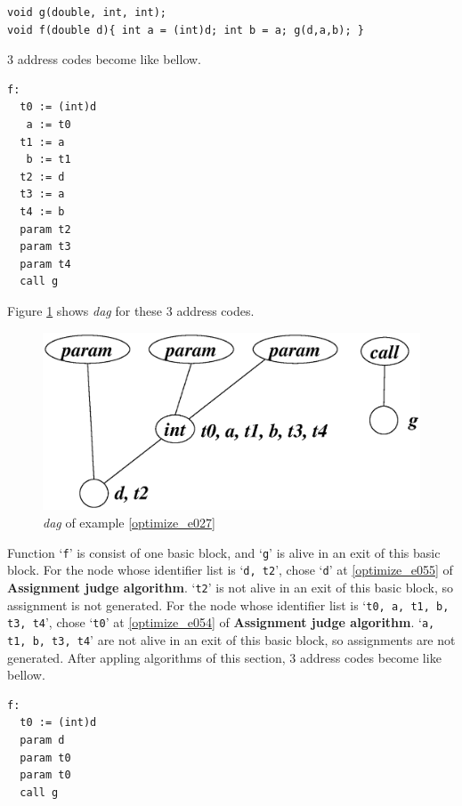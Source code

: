 \begin{Example}
\label{optimize_e027}
\begin{verbatim}
void g(double, int, int);
void f(double d){ int a = (int)d; int b = a; g(d,a,b); }
\end{verbatim}
3 address codes become like bellow.
\begin{verbatim}
f:
  t0 := (int)d
   a := t0
  t1 := a
   b := t1
  t2 := d
  t3 := a
  t4 := b
  param t2
  param t3
  param t4
  call g
\end{verbatim}
Figure \ref{optimize_e028} shows {\em dag} for these 3 address codes.
\begin{figure}[htbp]
\begin{center}
\includegraphics[width=1.0\linewidth,height=0.483\linewidth]{opt012.eps}
\caption{{\em dag} of example \ref{optimize_e027}}
\label{optimize_e028}
\end{center}
\end{figure}
Function `{\tt{f}}' is consist of one basic block, and 
`{\tt{g}}' is alive in an exit of this basic block.
For the node whose identifier list is `{\tt{d, t2}}',
chose `{\tt{d}}' at \ref{optimize_e055} of {\bf Assignment judge
 algorithm}.
`{\tt{t2}}' is not alive in an exit of this basic block, so
assignment is not generated.
For the node whose identifier list is `{\tt{t0, a, t1, b, t3, t4}}',
chose `{\tt{t0}}' at \ref{optimize_e054} of {\bf Assignment judge
 algorithm}.
`{\tt{a, t1, b, t3, t4}}' are not alive in an exit of this basic block, so
assignments are not generated.
After appling algorithms of this section,
3 address codes become like bellow.
\begin{verbatim}
f:
  t0 := (int)d
  param d
  param t0
  param t0
  call g
\end{verbatim}
\end{Example}

